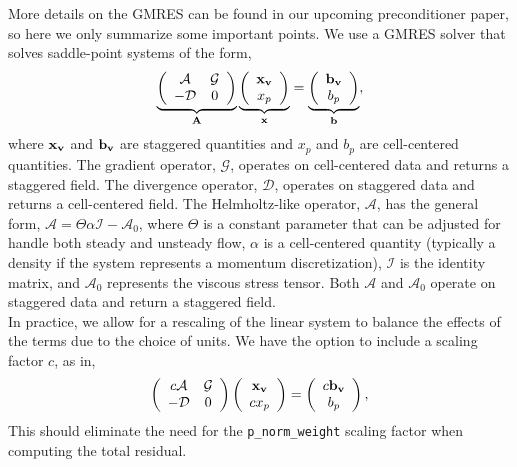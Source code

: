 \documentclass[final]{siamltex}
\def\Ab {{\bf A}}
\def\bb {{\bf b}}
\def\vb {{\bf v}}
\def\xb {{\bf x}}
\begin{document}
More details on the GMRES can be found in our upcoming preconditioner paper,
so here we only summarize some important points.
We use a GMRES solver that solves saddle-point systems of the form,
\begin{equation}
\underbrace{
\left(\begin{array}{cc}
\mathcal{A} & \mathcal{G} \\
-\mathcal{D} & 0
\end{array}\right)
}_{\Ab}
\underbrace{
\left(\begin{array}{c}
\xb_{\vb} \\
x_p
\end{array}\right)
}_{\xb}
=
\underbrace{
\left(\begin{array}{c}
\bb_{\vb}\\
b_p
\end{array}\right)}_{\bb},
\end{equation}
where $\xb_\vb$ and $\bb_\vb$ are staggered quantities and $x_p$ and $b_p$ are
cell-centered quantities.  The gradient operator, $\mathcal{G}$, operates on
cell-centered data and returns a staggered field.  The divergence operator, 
$\mathcal{D}$, operates on staggered data and returns a cell-centered field.  
The Helmholtz-like operator, $\mathcal{A}$, has the general form,
$\mathcal{A} = \Theta\alpha\mathcal{I} - \mathcal{A}_0$, where
$\Theta$ is a constant parameter that can be adjusted for handle both steady and unsteady flow,
$\alpha$ is a cell-centered quantity (typically a density if the system represents a momentum discretization),
$\mathcal{I}$ is the identity matrix, 
and $\mathcal{A}_0$ represents the viscous stress tensor.
Both $\mathcal{A}$ and $\mathcal{A}_0$ operate on staggered data and return
a staggered field.\\

In practice, we allow for a rescaling of the linear system to balance the effects of the terms
due to the choice of units.  We have the option to include a scaling factor $c$, as in,
\begin{equation}
\left(\begin{array}{cc}
c\mathcal{A} & \mathcal{G} \\
-\mathcal{D} & 0
\end{array}\right)
\left(\begin{array}{c}
\xb_{\vb} \\
cx_p
\end{array}\right)
=
\left(\begin{array}{c}
c\bb_{\vb}\\
b_p
\end{array}\right),
\end{equation}
This should eliminate the need for the {\tt p\_norm\_weight} scaling factor
when computing the total residual.\\
\end{document}
